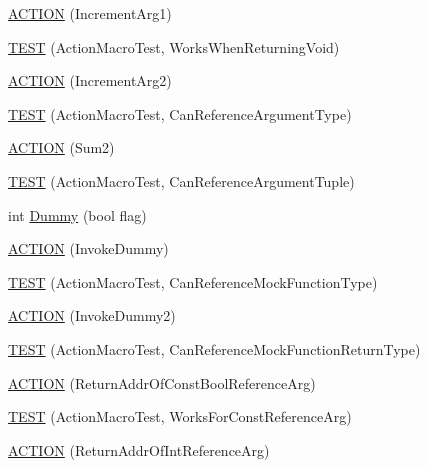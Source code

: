 \begin{DoxyCompactItemize}
\item 
\hyperlink{namespacetesting_1_1gmock__generated__actions__test_a960f5a5ca2b6a95ce1f3f1673b90d02d}{A\+C\+T\+I\+ON} (Increment\+Arg1)
\item 
\hyperlink{namespacetesting_1_1gmock__generated__actions__test_accde1673541c5076b0e09b3f1914c9d2}{T\+E\+ST} (Action\+Macro\+Test, Works\+When\+Returning\+Void)
\item 
\hyperlink{namespacetesting_1_1gmock__generated__actions__test_aa2c56f5c6a770b252ebdc27a6d8b613d}{A\+C\+T\+I\+ON} (Increment\+Arg2)
\item 
\hyperlink{namespacetesting_1_1gmock__generated__actions__test_abdfd8146dfbb5a152326a851b13e45cb}{T\+E\+ST} (Action\+Macro\+Test, Can\+Reference\+Argument\+Type)
\item 
\hyperlink{namespacetesting_1_1gmock__generated__actions__test_a108b4ee75c3b13445b7035fd5ecd6d6d}{A\+C\+T\+I\+ON} (Sum2)
\item 
\hyperlink{namespacetesting_1_1gmock__generated__actions__test_a4e2d8b9ac63b2f6dc6d4b17c3a767dee}{T\+E\+ST} (Action\+Macro\+Test, Can\+Reference\+Argument\+Tuple)
\item 
int \hyperlink{namespacetesting_1_1gmock__generated__actions__test_ab91824b86c842e024337b6de45eb8cdc}{Dummy} (bool flag)
\item 
\hyperlink{namespacetesting_1_1gmock__generated__actions__test_ae6806220035fcf097362dd736db4b03b}{A\+C\+T\+I\+ON} (Invoke\+Dummy)
\item 
\hyperlink{namespacetesting_1_1gmock__generated__actions__test_a1d3b8bb25c79d7e2167234f87935ea1e}{T\+E\+ST} (Action\+Macro\+Test, Can\+Reference\+Mock\+Function\+Type)
\item 
\hyperlink{namespacetesting_1_1gmock__generated__actions__test_a9f274ffcf4211cb03b4390cb0cc1ef1c}{A\+C\+T\+I\+ON} (Invoke\+Dummy2)
\item 
\hyperlink{namespacetesting_1_1gmock__generated__actions__test_a384a114235b474bb4318754e0d16f559}{T\+E\+ST} (Action\+Macro\+Test, Can\+Reference\+Mock\+Function\+Return\+Type)
\item 
\hyperlink{namespacetesting_1_1gmock__generated__actions__test_a78725817afcd5d7f19df2bdc2d41b9db}{A\+C\+T\+I\+ON} (Return\+Addr\+Of\+Const\+Bool\+Reference\+Arg)
\item 
\hyperlink{namespacetesting_1_1gmock__generated__actions__test_a8b4dadfc32c71e754d6ba3daae382715}{T\+E\+ST} (Action\+Macro\+Test, Works\+For\+Const\+Reference\+Arg)
\item 
\hyperlink{namespacetesting_1_1gmock__generated__actions__test_aeb01205293078272696bd0c19ce4e848}{A\+C\+T\+I\+ON} (Return\+Addr\+Of\+Int\+Reference\+Arg)

\end{DoxyCompactItemize}
